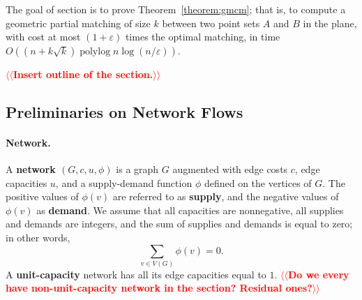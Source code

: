 \documentclass[11pt]{article}
\makeatletter
\def\polylog{\mathop{\mathrm{polylog}}}
\def\eps{\varepsilon}
\def\fsupply{\phi}
\theoremstyle{plain}
\newtheorem{theorem}[lemma]{Theorem}
\numberwithin{figure}{section}
\def\EMPH#1{\textbf{\boldmath #1}}
\def\n@te#1{\textsf{\boldmath \textbf{$\langle\!\langle$#1$\rangle\!\rangle$}}\leavevmode}
\def\note#1{\textcolor{red}{\n@te{#1}}}
\makeatother
\begin{document}
The goal of section is to prove Theorem~\ref{theorem:gmcm}; that is, to compute a geometric partial matching of size $k$ between two point sets $A$ and $B$ in the plane, with cost at most $(1+\eps)$ times the optimal matching, in time $O((n + k\sqrt{k})\polylog n \log(n/\eps))$.
%

\note{Insert outline of the section.}

\subsection{Preliminaries on Network Flows}

\paragraph{Network.}
A \EMPH{network $(G,c,u,\fsupply)$} is a graph $G$ augmented with edge
costs $c$, edge capacities $u$, and a supply-demand function $\fsupply$ defined on the vertices of $G$.
The positive values of $\fsupply(v)$ are referred to as \EMPH{supply}, and the negative values of $\fsupply(v)$ as \EMPH{demand}.
We assume that all capacities are nonnegative, all supplies and demands are integers, and the sum of supplies and demands is equal to zero; in other words,
\[
\sum_{v \in V(G)} \fsupply(v) = 0.
\]
%
A \EMPH{unit-capacity} network has all its edge capacities equal to $1$. \note{Do we every have non-unit-capacity network in the section? Residual ones?}
\end{document}
